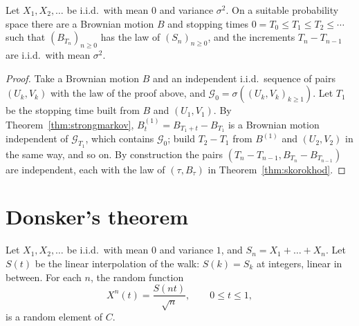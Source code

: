 \begin{corollary}\label{cor:embedwalk}
Let $X_1,X_2,\dots$ be i.i.d.\ with mean $0$ and variance $\sigma^2$. On a suitable probability space there are a Brownian motion $B$ and stopping times
$0=T_0\le T_1\le T_2\le\cdots$ such that $(B_{T_n})_{n\ge0}$ has the law of $(S_n)_{n\ge0}$, and the increments $T_n-T_{n-1}$ are i.i.d.\ with mean $\sigma^2$.
\end{corollary}
\begin{proof}
Take a Brownian motion $B$ and an independent i.i.d.\ sequence of pairs $(U_k,V_k)$ with the law of the proof above, and $\mathcal G_0=\sigma((U_k,V_k)_{k\ge1})$. Let $T_1$ be
the stopping time built from $B$ and $(U_1,V_1)$. By Theorem~\ref{thm:strongmarkov}, $B^{(1)}_t=B_{T_1+t}-B_{T_1}$ is a Brownian motion independent of
$\mathcal G_{T_1}$, which contains $\mathcal G_0$; build $T_2-T_1$ from $B^{(1)}$ and $(U_2,V_2)$ in the same way, and so on. By construction the pairs $(T_n-T_{n-1},
B_{T_n}-B_{T_{n-1}})$ are independent, each with the law of $(\tau,B_\tau)$ in Theorem~\ref{thm:skorokhod}.
\end{proof}

\section{Donsker's theorem}

Let $X_1,X_2,\dots$ be i.i.d.\ with mean $0$ and variance $1$, and $S_n=X_1+\dots+X_n$. Let $S(t)$ be the linear interpolation of the walk: $S(k)=S_k$ at integers, linear
in between. For each $n$, the random function
\[
X^n(t)=\frac{S(nt)}{\sqrt n},\qquad0\le t\le1,
\]
is a random element of $C$.

